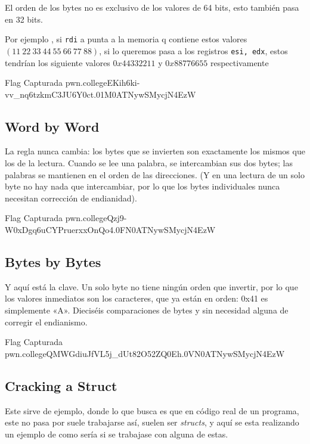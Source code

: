 El orden de los bytes no es exclusivo de los valores de 64 bits, esto
también pasa en 32 bits.

Por ejemplo , si \texttt{rdi} a punta a la memoria q contiene estos valores \( (11\ 22\ 33\ 44\ 55\ 66\ 77\ 88) \), si lo queremos
pasa a los registros \texttt{esi, edx}, estos tendrían los siguiente valores \( 0x44332211 \) y \( 0x88776655 \) respectivamente


\begin{flagbox}{Flag Capturada}
	pwn.college{EKih6ki-vv_nq6tzkmC3JU6Y0ct.01M0ATNywSMycjN4EzW}
\end{flagbox}

\subsection{Word by Word}\label{subsec:word_by_word}

La regla nunca cambia: los bytes que se invierten son exactamente los mismos que los de la lectura.
Cuando se lee una palabra, se intercambian sus dos bytes; las palabras se mantienen
en el orden de las direcciones. (Y en una lectura de un solo byte no hay nada que intercambiar,
por lo que los bytes individuales nunca necesitan corrección de endianidad).

\begin{flagbox}{Flag Capturada}
	pwn.college{Qzj9-W0xDgq6uCYPruerxxOnQo4.0FN0ATNywSMycjN4EzW}
\end{flagbox}
\subsection{Bytes by Bytes}\label{subsec:bytes_by_bytes}
Y aquí está la clave. Un solo byte no tiene ningún orden que invertir, por lo que
los valores inmediatos son los caracteres, que ya están en orden: 0x41 es simplemente «A».
Dieciséis comparaciones de bytes y sin necesidad alguna de corregir el endianismo.

\begin{flagbox}{Flag Capturada}
	pwn.college{QMWGdiuJfVL5j_dUt82O52ZQ0Eh.0VN0ATNywSMycjN4EzW}
\end{flagbox}

\subsection{Cracking a Struct}\label{subsec:cracking_a_struct}

Este sirve de ejemplo, donde lo que busca es que en código real de un programa, este no
pasa por suele trabajarse así, suelen ser \textit{structs}, y aquí se esta realizando
un ejemplo de como sería si se trabajase con alguna de estas.


